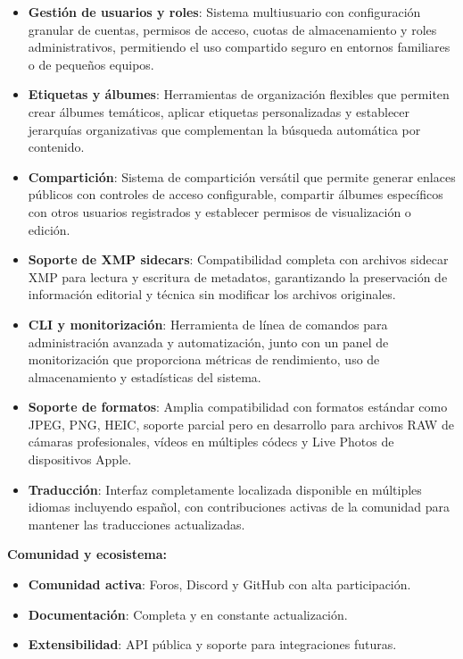 \begin{itemize}
    \item \textbf{Gestión de usuarios y roles}: Sistema multiusuario con configuración granular de cuentas, permisos de acceso, cuotas de almacenamiento y roles administrativos, permitiendo el uso compartido seguro en entornos familiares o de pequeños equipos.
    \item \textbf{Etiquetas y álbumes}: Herramientas de organización flexibles que permiten crear álbumes temáticos, aplicar etiquetas personalizadas y establecer jerarquías organizativas que complementan la búsqueda automática por contenido.
    \item \textbf{Compartición}: Sistema de compartición versátil que permite generar enlaces públicos con controles de acceso configurable, compartir álbumes específicos con otros usuarios registrados y establecer permisos de visualización o edición.
    \item \textbf{Soporte de XMP sidecars}: Compatibilidad completa con archivos sidecar XMP para lectura y escritura de metadatos, garantizando la preservación de información editorial y técnica sin modificar los archivos originales.
    \item \textbf{CLI y monitorización}: Herramienta de línea de comandos para administración avanzada y automatización, junto con un panel de monitorización que proporciona métricas de rendimiento, uso de almacenamiento y estadísticas del sistema.
    \item \textbf{Soporte de formatos}: Amplia compatibilidad con formatos estándar como JPEG, PNG, HEIC, soporte parcial pero en desarrollo para archivos RAW de cámaras profesionales, vídeos en múltiples códecs y Live Photos de dispositivos Apple.
    \item \textbf{Traducción}: Interfaz completamente localizada disponible en múltiples idiomas incluyendo español, con contribuciones activas de la comunidad para mantener las traducciones actualizadas.
\end{itemize}

\textbf{Comunidad y ecosistema:}
\begin{itemize}
    \item \textbf{Comunidad activa}: Foros, Discord y GitHub con alta participación.
    \item \textbf{Documentación}: Completa y en constante actualización.
    \item \textbf{Extensibilidad}: API pública y soporte para integraciones futuras.
\end{itemize}

